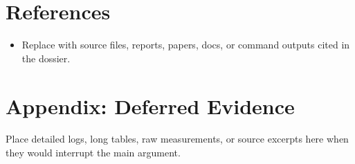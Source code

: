 \documentclass[11pt]{article}
\begin{document}
\section{References}
\begin{itemize}
  \item Replace with source files, reports, papers, docs, or command outputs cited in the dossier.
\end{itemize}

\appendix
\section{Appendix: Deferred Evidence}
Place detailed logs, long tables, raw measurements, or source excerpts here when they would interrupt the main argument.
\end{document}
